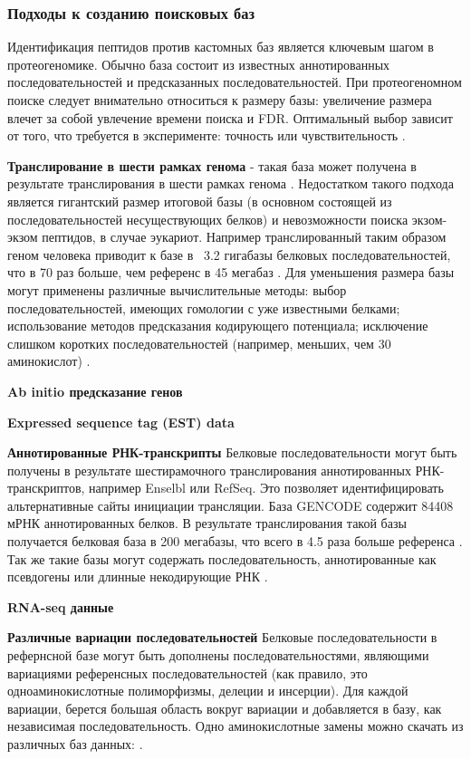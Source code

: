 \subsubsection{Подходы к созданию поисковых баз}
Идентификация пептидов против кастомных баз является ключевым шагом в протеогеномике. Обычно база состоит из известных аннотированных последовательностей и предсказанных последовательностей. При протеогеномном поиске следует внимательно относиться к размеру базы: увеличение размера влечет за собой увлечение времени поиска и FDR. Оптимальный выбор зависит от того, что требуется в эксперименте: точность или чувствительность \cite{nesvizhskii2014proteogenomics}.

\textbf{Транслирование в шести рамках генома} - такая база может получена в результате транслирования в шести рамках генома \cite{baerenfaller2008genome}. Недостатком такого подхода является гигантский размер итоговой базы (в основном состоящей из последовательностей несуществующих белков) и невозможности поиска экзом-экзом пептидов, в случае эукариот. Например транслированный таким образом геном человека приводит к базе в ~3.2 гигабазы белковых последовательностей, что в 70 раз больше, чем референс в 45 мегабаз \cite{khatun2013whole}. Для уменьшения размера базы могут применены различные вычислительные методы: выбор последовательностей, имеющих гомологии с уже известными белками; использование методов предсказания кодирующего потенциала; исключение слишком коротких последовательностей (например, меньших, чем 30 аминокислот) \cite{blakeley2012addressing}. 

\textbf{Ab initio предсказание генов} 

\textbf{Expressed sequence tag (EST) data}

\textbf{Аннотированные РНК-транскрипты} Белковые последовательности могут быть получены в результате шестирамочного транслирования аннотированных РНК-транскриптов, например Enselbl или RefSeq. Это позволяет идентифицировать альтернативные сайты инициации трансляции. База GENCODE содержит 84408 мРНК аннотированных белков. В результате транслирования такой базы получается белковая база в 200 мегабазы, что всего в 4.5 раза больше референса \cite{khatun2013whole}. Так же такие базы могут содержать последовательность, аннотированные как псевдогены или длинные некодирующие РНК \cite{derrien2012gencode}.

\textbf{RNA-seq данные}

\textbf{Различные вариации последовательностей} Белковые последовательности в рефернсной базе могут быть дополнены последовательностями, являющими вариациями референсных последовательностей (как правило, это одноаминокислотные полиморфизмы, делеции и инсерции). Для каждой вариации, берется большая область вокруг вариации и добавляется в базу, как независимая последовательность. Одно аминокислотные замены можно скачать из различных баз данных:  \cite{li2011bioinformatics}.  


